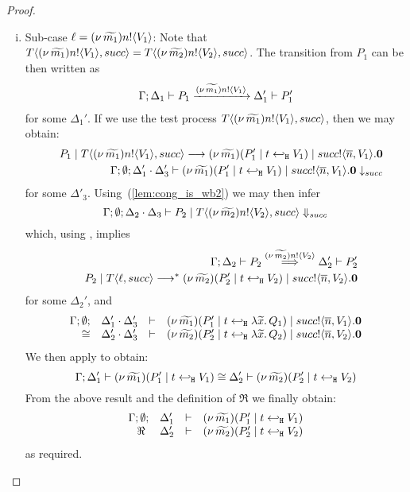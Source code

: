 \begin{proof}
\begin{enumerate}[1.]
\begin{enumerate}[i.]
				\item	Sub-case $\ell = (\nu\, \widetilde{m_1}) n ! \langle V_1 \rangle$:
Note that $T\langle (\nu\, \widetilde{m_1}) n ! \langle V_1 \rangle, succ \rangle = T\langle (\nu\, \widetilde{m_2}) n ! \langle V_2 \rangle, succ \rangle$.
The transition from $P_1$ can be then written as 
						\begin{eqnarray}
							\Gamma; \Delta_1 \vdash P_1 \xrightarrow{(\nu\, \widetilde{m_1}) n ! \langle V_1 \rangle} \Delta_1' \vdash P_1'
							\label{lem:cong_is_wb3}
						\end{eqnarray}
						for some $\Delta_1'$. If we use the test process $T\langle (\nu\, \widetilde{m_1}) n ! \langle V_1 \rangle, succ \rangle$, then we may obtain:%
						\begin{eqnarray*}
							&& P_1 \;|\; T\langle (\nu\, \widetilde{m_1}) n ! \langle V_1 \rangle, succ \rangle
							\longrightarrow
							(\nu\, \widetilde{m_1})(P_1' \;|\; t \hookleftarrow_{\mathtt{H}} V_1) \;|\; succ ! \langle \overline{n}, V_1 \rangle . \mathbf{0} \\
							&& \Gamma; \emptyset; \Delta_1' \cdot \Delta_3' \vdash (\nu\, \widetilde{m_1})(P_1' \;|\; t \hookleftarrow_{\mathtt{H}} V_1) \;|\; succ ! \langle \overline{n}, V_1 \rangle . \mathbf{0} \downarrow_{succ}
						\end{eqnarray*}
						for some $\Delta'_3$. Using~(\ref{lem:cong_is_wb2}) we may then infer
						\[
							\Gamma; \emptyset; \Delta_2 \cdot \Delta_3 \vdash P_2 \;|\; T\langle (\nu\, \widetilde{m_2}) n ! \langle V_2 \rangle, succ \rangle \Downarrow_{succ}
						\]
						\noi which, using , implies
						\begin{eqnarray}
							&& \Gamma; \Delta_2 \vdash P_2 \stackrel{(\nu\, \widetilde{m_2}) n ! \langle V_2 \rangle}{\Longrightarrow} \Delta_2' \vdash P_2'
							\label{lem:cong_is_wb4}\\
							&& P_2 \;|\; T \langle \ell, succ \rangle \longrightarrow^{*} (\nu\, \widetilde{m_2})(P_2' \;|\; t \hookleftarrow_{\mathtt{H}} V_2) \;|\; succ ! \langle \overline{n}, V_2 \rangle . \mathbf{0} \nonumber
						\end{eqnarray}
						for some $\Delta_2'$, and
						\[
							\begin{array}{rcll} \Gamma; \emptyset; &\Delta_1' \cdot \Delta_3'& \vdash& (\nu\, \widetilde{m_1})(P_1' \;|\; t \hookleftarrow_{\mathtt{H}} \lambda \widetilde{x}.\,Q_1) \;|\; succ ! \langle \overline{n}, V_1 \rangle . \mathbf{0}\\ \cong &\Delta_2' \cdot \Delta_3'& \vdash &  (\nu\, \widetilde{m_2})(P_2' \;|\; t \hookleftarrow_{\mathtt{H}} \lambda \widetilde{x}.\,Q_2) \;|\; succ ! \langle \overline{n}, V_2 \rangle . \mathbf{0} \end{array}
						\]
						\noi We then apply  to obtain:
						\[
							\Gamma; \Delta_1' \vdash (\nu\, \widetilde{m_1})(P_1' \;|\; t \hookleftarrow_{\mathtt{H}} V_1) \cong \Delta_2' \vdash{(\nu\, \widetilde{m_2})(P_2' \;|\;t \hookleftarrow_{\mathtt{H}} V_2)}
						\]
						\noi From the above result and the definition of $\Re$ we finally obtain:
						\[
							\begin{array}{rcll} \Gamma; \emptyset; &\Delta_1'& \vdash& (\nu\, \widetilde{m_1})(P_1' \;|\; t \hookleftarrow_{\mathtt{H}} V_1)\\ \ \Re\  &\Delta_2'& \vdash &  (\nu\, \widetilde{m_2})(P_2' \;|\; t \hookleftarrow_{\mathtt{H}} V_2) \end{array}
						\]
						\noi as required.


\end{enumerate}
\end{enumerate}
\end{proof}
